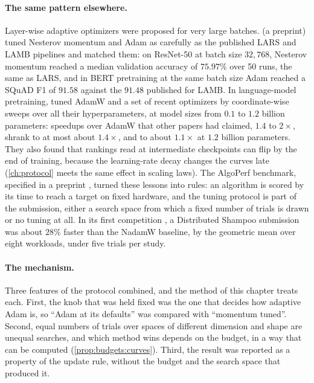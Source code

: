 \begin{refsection}
\paragraph{The same pattern elsewhere.} Layer-wise adaptive optimizers were proposed for very large batches. \Textcite{NadoEtAl2021} (a preprint) tuned Nesterov momentum and Adam as carefully as the published LARS and LAMB pipelines and matched them: on ResNet-50 at batch size $32{,}768$, Nesterov momentum reached a median validation accuracy of $75.97\%$ over 50 runs, the same as LARS, and in BERT pretraining at the same batch size Adam reached a SQuAD F1 of $91.58$ against the $91.48$ published for LAMB. In language-model pretraining, \textcite{WenEtAl2026} tuned AdamW and a set of recent optimizers by coordinate-wise sweeps over all their hyperparameters, at model sizes from $0.1$ to $1.2$ billion parameters: speedups over AdamW that other papers had claimed, $1.4$ to $2\times$, shrank to at most about $1.4\times$, and to about $1.1\times$ at $1.2$ billion parameters. They also found that rankings read at intermediate checkpoints can flip by the end of training, because the learning-rate decay changes the curves late (\cref{ch:protocol} meets the same effect in scaling laws). The AlgoPerf benchmark, specified in a preprint \parencite{DahlEtAl2023}, turned these lessons into rules: an algorithm is scored by its time to reach a target on fixed hardware, and the tuning protocol is part of the submission, either a search space from which a fixed number of trials is drawn or no tuning at all. In its first competition \parencite{KasimbegEtAl2025}, a Distributed Shampoo submission was about $28\%$ faster than the NadamW baseline, by the geometric mean over eight workloads, under five trials per study.

\paragraph{The mechanism.} Three features of the protocol combined, and the method of this chapter treats each. First, the knob that was held fixed was the one that decides how adaptive Adam is, so \enquote{Adam at its defaults} was compared with \enquote{momentum tuned}. Second, equal numbers of trials over spaces of different dimension and shape are unequal searches, and which method wins depends on the budget, in a way that can be computed (\cref{prop:budgets:curves}). Third, the result was reported as a property of the update rule, without the budget and the search space that produced it.


\end{refsection}
